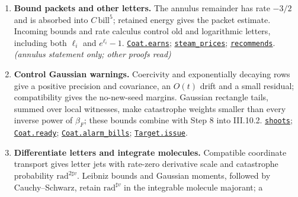 \documentclass[
  letterpaper,
  11pt]{article}
\begin{document}
\begin{enumerate}
\item
  \textbf{Bound packets and other letters.} The annulus remainder has
  rate \(-3/2\) and is absorbed into \(C\,\mathrm{bill}^5\); retained
  energy gives the packet estimate. Incoming bounds and rate calculus
  control old and logarithmic letters, including both \(\ell_i\) and
  \(e^{\ell_i}-1\).
  \href{https://github.com/yang-mills-group/OpenAI-YM-20261028/blob/3456e5e75cf8d4cd558955a5c7638fba2d68f464/YM/AnalyticNext/CONNECTED_ACTIVITY_JETS_E6/AssignedPrice.lean\#L54-L86}{\texttt{Coat.earns}};
  \href{https://github.com/yang-mills-group/OpenAI-YM-20261028/blob/3456e5e75cf8d4cd558955a5c7638fba2d68f464/YM/AnalyticNext/CONNECTED_ACTIVITY_JETS_E6/Revenue.lean\#L99-L140}{\texttt{steam\_prices}};
  \href{https://github.com/yang-mills-group/OpenAI-YM-20261028/blob/3456e5e75cf8d4cd558955a5c7638fba2d68f464/YM/AnalyticNext/CONNECTED_ACTIVITY_JETS_E6/Quotation.lean\#L47-L92}{\texttt{recommends}}.
  \emph{(annulus statement only; other proofs read)}
\item
  \textbf{Control Gaussian warnings.} Coercivity and exponentially
  decaying rows give a positive precision and covariance, an \(O(t)\)
  drift and a small residual; compatibility gives the no-new-seed
  margins. Gaussian rectangle tails, summed over local witnesses, make
  catastrophe weights smaller than every inverse power of \(\beta_F\);
  these bounds combine with Step 8 into III.10.2.
  \href{https://github.com/yang-mills-group/OpenAI-YM-20261028/blob/3456e5e75cf8d4cd558955a5c7638fba2d68f464/YM/AnalyticNext/CONNECTED_ACTIVITY_JETS_E6/Shutter.lean\#L119-L144}{\texttt{shoots}};
  \href{https://github.com/yang-mills-group/OpenAI-YM-20261028/blob/3456e5e75cf8d4cd558955a5c7638fba2d68f464/YM/AnalyticNext/CONNECTED_ACTIVITY_JETS_E6/Peak.lean\#L92-L188}{\texttt{Coat.ready}};
  \href{https://github.com/yang-mills-group/OpenAI-YM-20261028/blob/3456e5e75cf8d4cd558955a5c7638fba2d68f464/YM/AnalyticNext/CONNECTED_ACTIVITY_JETS_E6/ResponsePrice.lean\#L65-L112}{\texttt{Coat.alarm\_bills}};
  \href{https://github.com/yang-mills-group/OpenAI-YM-20261028/blob/3456e5e75cf8d4cd558955a5c7638fba2d68f464/YM/AnalyticNext/CONNECTED_ACTIVITY_JETS_E6/Issue.lean\#L94-L185}{\texttt{Target.issue}}.
\item
  \textbf{Differentiate letters and integrate molecules.} Compatible
  coordinate transport gives letter jets with rate-zero derivative scale
  and catastrophe probability \(\mathrm{rad}^{2\sharp v}\). Leibniz
  bounds and Gaussian moments, followed by Cauchy--Schwarz, retain
  \(\mathrm{rad}^{\sharp v}\) in the integrable molecule majorant; a

\end{enumerate}
\end{document}
